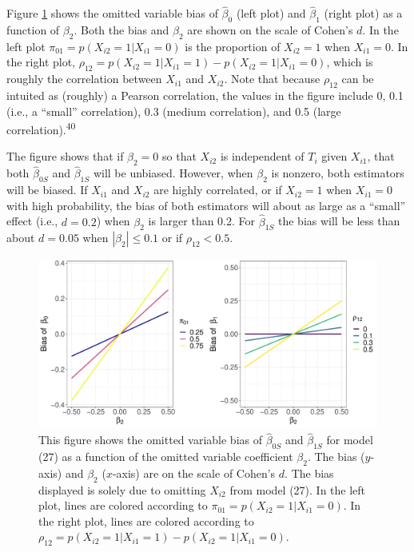 \documentclass[
]{article}
\begin{document}
Figure \ref{fig:omitted-bias} shows the omitted variable bias of \(\hat{\beta}_0\) (left plot) and \(\hat{\beta}_1\) (right plot) as a function of \(\beta_2\).
Both the bias and \(\beta_2\) are shown on the scale of Cohen's \(d\).
In the left plot \(\pi_{01} = p(X_{i2} = 1 | X_{i1} = 0)\) is the proportion of \(X_{i2} = 1\) when \(X_{i1} = 0\).
In the right plot, \(\rho_{12} = p(X_{i2} = 1 | X_{i1} = 1) - p(X_{i2} = 1 | X_{i1} = 0)\), which is roughly the correlation between \(X_{i1}\) and \(X_{i2}\).
Note that because \(\rho_{12}\) can be intuited as (roughly) a Pearson correlation, the values in the figure include 0, 0.1 (i.e., a ``small'' correlation), 0.3 (medium correlation), and 0.5 (large correlation).\textsuperscript{40}

The figure shows that if \(\beta_2 = 0\) so that \(X_{i2}\) is independent of \(T_i\) given \(X_{i1}\), that both \(\hat{\beta}_{0S}\) and \(\hat{\beta}_{1S}\) will be unbiased.
However, when \(\beta_2\) is nonzero, both estimators will be biased.
If \(X_{i1}\) and \(X_{i2}\) are highly correlated, or if \(X_{i2} = 1\) when \(X_{i1} = 0\) with high probability, the bias of both estimators will about as large as a ``small'' effect (i.e., \(d = 0.2\)) when \(\beta_2\) is larger than 0.2.
For \(\hat{\beta}_{1S}\) the bias will be less than about \(d = 0.05\) when \(|\beta_2| \leq 0.1\) or if \(\rho_{12} < 0.5\).

\begin{figure}
\begin{center}
\includegraphics[width = \textwidth]{./graphics/omitted_var_bias}
\end{center}
\caption{This figure shows the omitted variable bias of $\hat{\beta}_{0S}$ and $\hat{\beta}_{1S}$ for model (27) as a function of the omitted variable coefficient $\beta_2$. The bias ($y$-axis) and $\beta_2$ ($x$-axis) are on the scale of Cohen's $d$. The bias displayed is solely due to omitting $X_{i2}$ from model (27). In the left plot, lines are colored according to $\pi_{01} = p(X_{i2} = 1 | X_{i1} = 0)$. In the right plot, lines are colored according to $\rho_{12} = p(X_{i2} = 1 | X_{i1} = 1) - p(X_{i2} = 1 | X_{i1} = 0)$.}
\label{fig:omitted-bias}
\end{figure}
\end{document}
